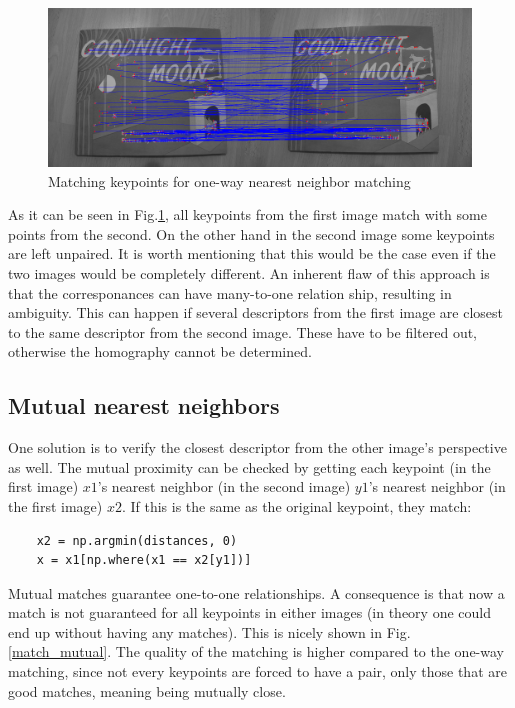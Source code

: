 \documentclass[10pt,a4paper,twoside]{article}
\begin{document}
\begin{figure}[t]
    \includegraphics[width=\textwidth]{match_ow.png}
    \centering
    \caption{Matching keypoints for one-way nearest neighbor matching}
    \label{match_ow}
\end{figure}

As it can be seen in Fig.\ref{match_ow}, all keypoints from the first image
match with some points from the second. On the other hand in the second image
some keypoints are left unpaired. It is worth mentioning that this would be the
case even if the two images would be completely different. An inherent flaw of
this approach is that the corresponances can have many-to-one relation ship,
resulting in ambiguity. This can happen if several descriptors from the first
image are closest to the same descriptor from the second image. These have to be
filtered out, otherwise the homography cannot be determined.

\subsection*{Mutual nearest neighbors} 
One solution is to verify the closest descriptor from the other image's
perspective as well. The mutual proximity can be checked by getting each
keypoint (in the first image) $x1$'s nearest neighbor (in the second image)  $y1$'s nearest
neighbor (in the first image) $x2$. If this is the same as the original keypoint,
they match:
\begin{verbatim}
    x2 = np.argmin(distances, 0)
    x = x1[np.where(x1 == x2[y1])]
\end{verbatim}


Mutual matches guarantee one-to-one relationships. A
consequence is that now a match is not guaranteed for all keypoints in either
images (in theory one could end up without having any matches). This is nicely
shown in Fig.\ref{match_mutual}. The quality of the matching is higher compared
to the one-way matching, since not every keypoints are forced to have a pair,
only those that are good matches, meaning being mutually close.
\end{document}
